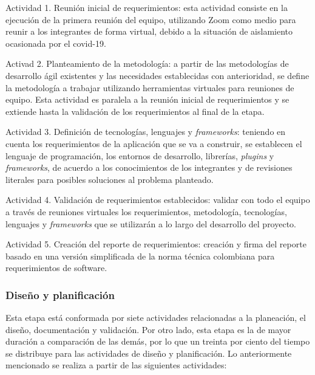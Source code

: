 \begin{APAitemize}
    \item Actividad 1. Reunión inicial de requerimientos: esta actividad consiste en la ejecución de la primera reunión del equipo, utilizando Zoom como medio para reunir a los integrantes de forma virtual, debido a la situación de aislamiento ocasionada por el covid-19.
    \item Activad 2. Planteamiento de la metodología: a partir de las metodologías de desarrollo ágil existentes y las necesidades establecidas con anterioridad, se define la metodología a trabajar utilizando herramientas virtuales para reuniones de equipo. Esta actividad es paralela a la reunión inicial de requerimientos y se extiende hasta la validación de los requerimientos al final de la etapa.
    \item Actividad 3. Definición de tecnologías, lenguajes y \textit{frameworks}: teniendo en cuenta los requerimientos de la aplicación que se va a construir, se establecen el lenguaje de programación, los entornos de desarrollo, librerías, \textit{plugins} y \textit{frameworks}, de acuerdo a los conocimientos de los integrantes y de revisiones literales para posibles soluciones al problema planteado.
    \item Actividad 4. Validación de requerimientos establecidos: validar con todo el equipo a través de reuniones virtuales los requerimientos, metodología, tecnologías, lenguajes y \textit{frameworks} que se utilizarán a lo largo del desarrollo del proyecto.
    \item Actividad 5. Creación del reporte de requerimientos: creación y firma del reporte basado en una versión simplificada de la norma técnica colombiana para requerimientos de software. 
\end{APAitemize}

\subsubsection{Diseño y planificación}
Esta etapa está conformada por siete actividades relacionadas a la planeación, el diseño, documentación y validación. Por otro lado, esta etapa es la de mayor duración a comparación de las demás, por lo que un treinta por ciento del tiempo se distribuye para las actividades de diseño y planificación. Lo anteriormente mencionado se realiza a partir de las siguientes actividades:

